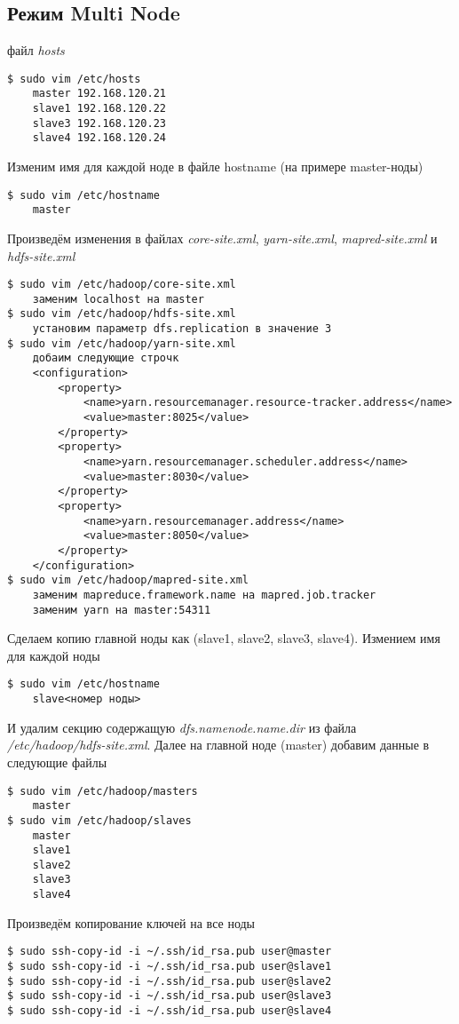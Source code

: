 \subsection{Режим Multi Node}
 файл \emph{hosts}
\begin{lstlisting}
$ sudo vim /etc/hosts
    master 192.168.120.21
    slave1 192.168.120.22
    slave3 192.168.120.23
    slave4 192.168.120.24
\end{lstlisting}
Изменим имя для каждой ноде в файле hostname (на примере master-ноды)
\begin{lstlisting}
$ sudo vim /etc/hostname
    master
\end{lstlisting}
Произведём изменения в файлах \emph{core-site.xml}, \emph{yarn-site.xml}, \emph{mapred-site.xml} и \\
\emph{hdfs-site.xml}
\begin{lstlisting}
$ sudo vim /etc/hadoop/core-site.xml
    заменим localhost на master
$ sudo vim /etc/hadoop/hdfs-site.xml
    установим параметр dfs.replication в значение 3
$ sudo vim /etc/hadoop/yarn-site.xml
    добаим следующие строчк
    <configuration>
        <property>
            <name>yarn.resourcemanager.resource-tracker.address</name>
            <value>master:8025</value>
        </property>
        <property>
            <name>yarn.resourcemanager.scheduler.address</name>
            <value>master:8030</value>
        </property>
        <property>
            <name>yarn.resourcemanager.address</name>
            <value>master:8050</value>
        </property>
    </configuration>
$ sudo vim /etc/hadoop/mapred-site.xml
    заменим mapreduce.framework.name на mapred.job.tracker
    заменим yarn на master:54311
\end{lstlisting}
Сделаем копию главной ноды как (slave1, slave2, slave3, slave4). Измением имя для каждой ноды
\begin{lstlisting}
$ sudo vim /etc/hostname
    slave<номер ноды>
\end{lstlisting}
И удалим секцию содержащую \emph{dfs.namenode.name.dir} из файла \emph{/etc/hadoop/hdfs-site.xml}. Далее на 
главной ноде (master) добавим данные в следующие файлы
\begin{lstlisting}
$ sudo vim /etc/hadoop/masters
    master
$ sudo vim /etc/hadoop/slaves
    master
    slave1
    slave2
    slave3
    slave4
\end{lstlisting}
Произведём копирование ключей на все ноды
\begin{lstlisting}
$ sudo ssh-copy-id -i ~/.ssh/id_rsa.pub user@master
$ sudo ssh-copy-id -i ~/.ssh/id_rsa.pub user@slave1
$ sudo ssh-copy-id -i ~/.ssh/id_rsa.pub user@slave2
$ sudo ssh-copy-id -i ~/.ssh/id_rsa.pub user@slave3
$ sudo ssh-copy-id -i ~/.ssh/id_rsa.pub user@slave4
\end{lstlisting}
